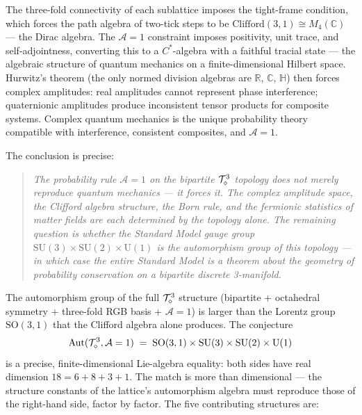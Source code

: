 The three-fold connectivity of each sublattice imposes the tight-frame
condition, which forces the path algebra of two-tick steps to be
$\text{Clifford}(3,1)\cong M_4(\mathbb{C})$ --- the Dirac algebra.
The $\mathcal{A}=1$ constraint imposes positivity, unit trace, and
self-adjointness, converting this to a $C^*$-algebra with a faithful
tracial state --- the algebraic structure of quantum mechanics on a
finite-dimensional Hilbert space.
Hurwitz's theorem (the only normed division algebras are $\mathbb{R}$,
$\mathbb{C}$, $\mathbb{H}$) then forces complex amplitudes: real
amplitudes cannot represent phase interference; quaternionic amplitudes
produce inconsistent tensor products for composite systems.
Complex quantum mechanics is the unique probability theory compatible
with interference, consistent composites, and $\mathcal{A}=1$.

The conclusion is precise:
\begin{quote}
\textit{The probability rule $\mathcal{A}=1$ on the bipartite
$\mathcal{T}_\diamond^3$ topology does not merely reproduce quantum mechanics ---
it forces it.
The complex amplitude space, the Clifford algebra structure, the Born
rule, and the fermionic statistics of matter fields are each determined
by the topology alone.
The remaining question is whether the Standard Model gauge group
$\mathrm{SU}(3)\times\mathrm{SU}(2)\times\mathrm{U}(1)$ is the
automorphism group of this topology --- in which case the entire
Standard Model is a theorem about the geometry of probability
conservation on a bipartite discrete 3-manifold.}
\end{quote}

The automorphism group of the full $\mathcal{T}_\diamond^3$ structure (bipartite +
octahedral symmetry + three-fold RGB basis + $\mathcal{A}=1$) is larger
than the Lorentz group $\mathrm{SO}(3,1)$ that the Clifford algebra
alone produces.
The conjecture
\begin{equation}
\mathrm{Aut}(\mathcal{T}_\diamond^3,\mathcal{A}=1)
\;=\; \mathrm{SO}(3,1) \times \mathrm{SU}(3) \times \mathrm{SU}(2) \times \mathrm{U}(1)
\label{eq:automorphism_conjecture}
\end{equation}
is a precise, finite-dimensional Lie-algebra equality: both sides
have real dimension $18 = 6 + 8 + 3 + 1$.  The match is more than
dimensional --- the structure constants of the lattice's automorphism
algebra must reproduce those of the right-hand side, factor by
factor.  The five contributing structures are:

